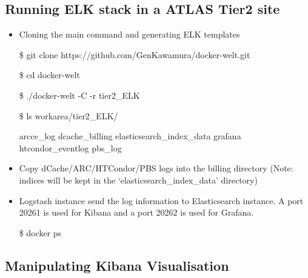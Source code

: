 \documentclass[]{article}
\begin{document}
\subsection{Running ELK stack in a ATLAS Tier2
site}\label{running-elk-stack-in-a-atlas-tier2-site}

\begin{itemize}
\item
  Cloning the main command and generating ELK templates

  \$ git clone https://github.com/GenKawamura/docker-welt.git

  \$ cd docker-welt

  \$ ./docker-welt -C -r tier2\_ELK

  \$ ls workarea/tier2\_ELK/

  arcce\_log dcache\_billing elasticsearch\_index\_data grafana
  htcondor\_eventlog pbs\_log
\item
  Copy dCache/ARC/HTCondor/PBS logs into the billing directory (Note:
  indices will be kept in the `elasticsearch\_index\_data' directory)
\item
  Logstash instance send the log information to Elasticsearch instance.
  A port 20261 is used for Kibana and a port 20262 is used for Grafana.

  \$ docker ps
\end{itemize}

\subsection{Manipulating Kibana
Visualisation}\label{manipulating-kibana-visualisation}
\end{document}
